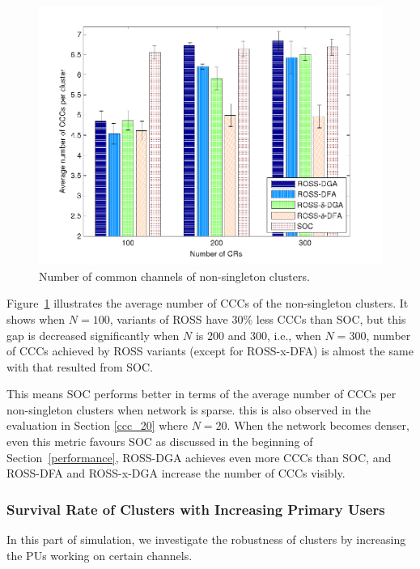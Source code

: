 \documentclass[10pt,journal,compsoc]{IEEEtran}
\theoremstyle{mytheoremstyle}
\theoremstyle{mytheoremstyle}
\theoremstyle{mytheoremstyle}
\newcommand{\ie}{i.e., }
\begin{document}
\begin{figure}[ht!]
  \centering
  \includegraphics[width=1\linewidth]{ccc_large_scale_color.pdf}
  \caption{Number of common channels of non-singleton clusters.}
  \label{ccc_large_scale}
\end{figure}

Figure~\ref{ccc_large_scale} illustrates the average number of CCCs of the non-singleton clusters.
It shows when $N=100$, variants of ROSS have 30\% less CCCs than SOC, but this gap is decreased significantly when $N$ is 200 and 300, \ie when $N=300$, number of CCCs achieved by ROSS variants (except for ROSS-x-DFA) is almost the same with that resulted from SOC.

This means SOC performs better in terms of the average number of CCCs per non-singleton clusters when network is sparse.
this is also observed in the evaluation in Section \ref{ccc_20} where $N=20$.
When the network becomes denser, even this metric favours SOC as discussed in the beginning of Section~\ref{performance}, ROSS-DGA achieves even more CCCs than SOC, and ROSS-DFA and ROSS-x-DGA increase the number of CCCs visibly.




\subsubsection{Survival Rate of Clusters with Increasing Primary Users}

In this part of simulation, we investigate the robustness of clusters by increasing the PUs working on certain channels.
 
\end{document}
